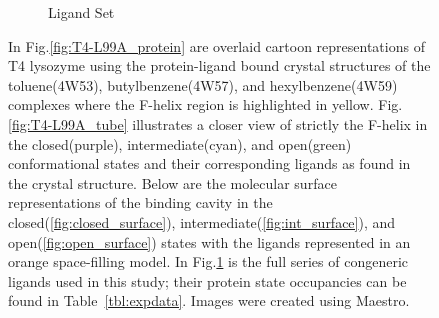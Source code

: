 \begin{figure}[!ht]
\begin{subfigure}{0.75\textwidth}
   \caption{Ligand Set}
   \label{fig:ligand_set}
\end{subfigure}\hfill
\caption{In Fig.\ref{fig:T4-L99A_protein} are overlaid cartoon representations of T4 lysozyme using the protein-ligand bound crystal structures of the toluene(4W53), butylbenzene(4W57), and hexylbenzene(4W59) complexes where the F-helix region is highlighted in yellow.
Fig.\ref{fig:T4-L99A_tube} illustrates a closer view of strictly the F-helix in the closed(purple), intermediate(cyan), and open(green) conformational states and their corresponding ligands as found in the crystal structure.
Below are the molecular surface representations of the binding cavity in the closed(\ref{fig:closed_surface}), intermediate(\ref{fig:int_surface}), and open(\ref{fig:open_surface}) states with the ligands represented in an orange space-filling model.
In Fig.\ref{fig:ligand_set} is the full series of congeneric ligands used in this study; their protein state occupancies can be found in Table~\ref{tbl:expdata}.
Images were created using Maestro\cite{Maestro}.}
\label{fig:T4-L99A}
\end{figure}

